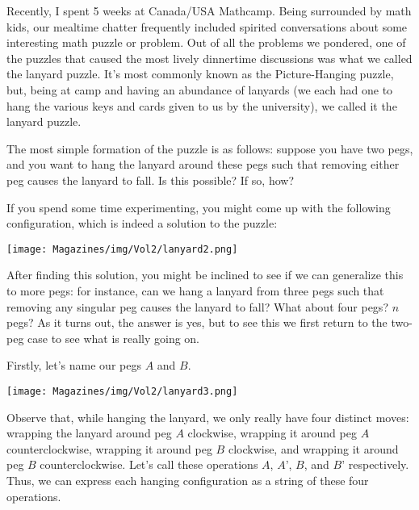 \documentclass{article}
\begin{document}
\vspace{3mm}


\begin{multicols}{3}


Recently, I spent 5 weeks at Canada/USA Mathcamp. Being surrounded by math kids, our mealtime chatter frequently included spirited conversations about some interesting math puzzle or problem. Out of all the problems we pondered, one of the puzzles that caused the most lively dinnertime discussions was what we called the lanyard puzzle. It’s most commonly known as the Picture-Hanging puzzle, but, being at camp and having an abundance of lanyards (we each had one to hang the various keys and cards given to us by the university), we called it the lanyard puzzle. 

The most simple formation of the puzzle is as follows: suppose you have two pegs, and you want to hang the lanyard around these pegs such that removing either peg causes the lanyard to fall. Is this possible? If so, how? 

If you spend some time experimenting, you might come up with the following configuration, which is indeed a solution to the puzzle:

\begin{center}
    \texttt{[image: Magazines/img/Vol2/lanyard2.png]}
\end{center}

After finding this solution, you might be inclined to see if we can generalize this to more pegs: for instance, can we hang a lanyard from three pegs such that removing any singular peg causes the lanyard to fall? What about four pegs? $n$ pegs? As it turns out, the answer is yes, but to see this we first return to the two-peg case to see what is really going on. 

Firstly, let's name our pegs $A$ and $B$. 

\begin{center}
    \texttt{[image: Magazines/img/Vol2/lanyard3.png]}
\end{center}

Observe that, while hanging the lanyard, we only really have four distinct moves: wrapping the lanyard around peg $A$ clockwise, wrapping it around peg $A$ counterclockwise, wrapping it around peg $B$ clockwise, and wrapping it around peg $B$ counterclockwise. Let’s call these operations $A$, $A’$, $B$, and $B’$ respectively. Thus, we can express each hanging configuration as a string of these four operations. 


\end{multicols}
\end{document}
